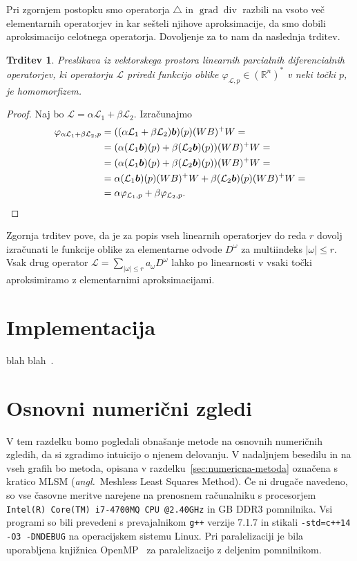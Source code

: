 \documentclass[12pt,a4paper,twoside]{article}
\theoremstyle{definition} %
\theoremstyle{plain} %
\newtheorem{trditev}[definicija]{Trditev}
\numberwithin{equation}{section}
\newcommand{\R}{\mathbb R}
\renewcommand{\L}{\mathcal{L}}
\newcommand{\lap}{\triangle}
\renewcommand{\div}{\operatorname{div}}
\newcommand{\grad}{\operatorname{grad}}
\renewcommand{\b}{\boldsymbol}
\renewcommand{\phi}{\varphi}
\newcommand{\ang}[1]{(\textit{angl.}\ #1)}
\begin{document}
Pri zgornjem postopku smo operatorja $\lap$ in $\grad \div$ razbili na vsoto več elementarnih
operatorjev in kar sešteli njihove aproksimacije, da smo dobili aproksimacijo celotnega operatorja.
Dovoljenje za to nam da naslednja trditev.

\begin{trditev}
  Preslikava iz vektorskega prostora linearnih parcialnih diferencialnih operatorjev, ki operatorju
  $\L$ priredi funkcijo oblike $\phi_{\L,p} \in (\R^n)^\ast$ v neki točki $p$, je homomorfizem.
\end{trditev}
\begin{proof}
Naj bo $\L = \alpha \L_1 + \beta \L_2$. Izračunajmo
  \begin{align*}
    \phi_{\alpha \L_1 + \beta \L_2,p} &=
    ((\alpha \L_1 + \beta \L_2)\b b)(p)(WB)^+W = \\
    &= (\alpha (\L_1\b b)(p) + \beta (\L_2\b b)(p))(WB)^+W = \\
    &= (\alpha (\L_1\b b)(p) + \beta (\L_2\b b)(p))(WB)^+W =\\
  &= \alpha (\L_1\b b)(p)(WB)^+W + \beta (\L_2\b b)(p)(WB)^+W = \\
  &= \alpha \phi_{\L_1,p} + \beta \phi_{\L_2,p}. \qedhere
  \end{align*}
\end{proof}
Zgornja trditev pove, da je za popis vseh linearnih operatorjev do reda $r$ dovolj
izračunati le funkcije oblike za elementarne odvode $D^\omega$ za multiindeks $|\omega| \leq r$.
Vsak drug operator $\L = \sum_{|\omega| \leq r} a_\omega D^\omega$ lahko po linearnosti
v vsaki točki aproksimiramo z elementarnimi aproksimacijami.

\section{Implementacija}
\label{sec:implementacija}
blah blah~\cite{stroustrup1995c++}.

\section{Osnovni numerični zgledi}
\label{sec:osnovni-zgledi}
V tem razdelku bomo pogledali obnašanje metode na osnovnih numeričnih zgledih, da si zgradimo
intuicijo o njenem delovanju. V nadaljnjem besedilu in na vseh grafih bo metoda, opisana v
razdelku~\ref{sec:numericna-metoda} označena s kratico MLSM \ang{Meshless Least Squares Method}.  Če
ni drugače navedeno, so vse časovne meritve narejene na prenosnem računalniku s procesorjem
\verb|Intel(R) Core(TM) i7-4700MQ CPU @2.40GHz| in \unit[16]{GB} DDR3 pomnilnika. Vsi programi so
bili prevedeni s prevajalnikom \verb|g++| verzije 7.1.7 in stikali \verb|-std=c++14 -O3 -DNDEBUG| na
operacijskem sistemu Linux.  Pri paralelizaciji je bila uporabljena knjižnica
OpenMP~\cite{dagum1998openmp} za paralelizacijo z deljenim pomnilnikom.
\end{document}
